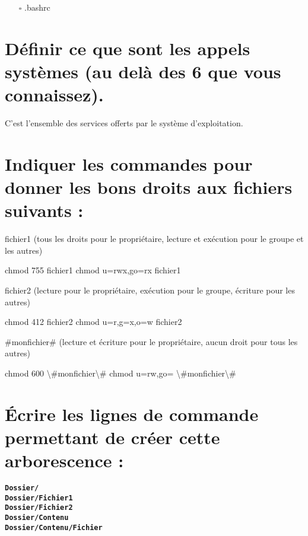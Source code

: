\documentclass[11pt,a4paper]{article}
\newcommand{\CaseCoche}{\fontsize{20}{20}\selectfont $ \square $}
\newcommand{\TTBF}[1]{\texttt{\textbf{#1}}}
\begin{document}
\begin{itemize}
\item[\CaseCoche] .bashrc\\
\end{itemize}

\bigskip

\section{Définir ce que sont les appels systèmes (au delà des 6 que vous connaissez).}

\bigskip
C'est l'ensemble des services offerts par le système d'exploitation.
\bigskip

\section{Indiquer les commandes pour donner les bons droits aux fichiers suivants :}

\medskip

\noindent fichier1 (tous les droits pour le propriétaire, lecture et exécution pour le groupe et les autres)

\bigskip

chmod 755 fichier1 \qquad chmod u=rwx,go=rx fichier1

\bigskip

\noindent fichier2 (lecture pour le propriétaire, exécution pour le groupe, écriture pour les autres)

\bigskip

chmod 412 fichier2 \qquad chmod u=r,g=x,o=w fichier2

\bigskip

\noindent \#monfichier\# (lecture et écriture pour le propriétaire, aucun droit pour tous les autres)

\bigskip

chmod 600 \textbackslash \#monfichier\textbackslash \# \qquad chmod u=rw,go= \textbackslash \#monfichier\textbackslash \#

\bigskip

\section{\'Ecrire les lignes de commande permettant de créer cette arborescence : }

\medskip

\noindent \TTBF{Dossier/}\\
\noindent \TTBF{Dossier/Fichier1}\\
\noindent \TTBF{Dossier/Fichier2}\\
\noindent \TTBF{Dossier/Contenu}\\
\noindent \TTBF{Dossier/Contenu/Fichier}\\
\end{document}
